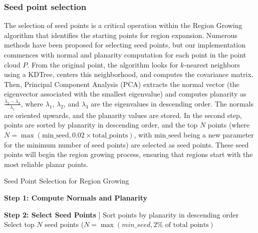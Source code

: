 \documentclass[a4paper,9pt]{article}
\begin{document}
\subsubsection{Seed point selection}

The selection of seed points is a critical operation within the Region Growing algorithm that identifies the starting points for region expansion. Numerous methods have been proposed for selecting seed points, but our implementation commences with normal and planarity computation for each point in the point cloud \( P \). From the original point, the algorithm looks for \( k \)-nearest neighbors using a KDTree, centers this neighborhood, and computes the covariance matrix. Then, Principal Component Analysis (PCA) extracts the normal vector (the eigenvector associated with the smallest eigenvalue) and computes planarity as \( \frac{\lambda_2 - \lambda_3}{\lambda_1} \), where \( \lambda_1 \), \( \lambda_2 \), and \( \lambda_3 \) are the eigenvalues in descending order. The normals are oriented upwards, and the planarity values are stored. In the second step, points are sorted by planarity in descending order, and the top \( N \) points (where \( N = \max(\text{min\_seed}, 0.02 \times \text{total\_points}) \), with \(\text{min\_seed}\) being a new parameter for the minimum number of seed points) are selected as seed points. These seed points will begin the region growing process, ensuring that regions start with the most reliable planar points.


\begin{algorithm}[H]
\caption{Seed Point Selection for Region Growing}
\label{alg:plane_detection}


\BlankLine
\textbf{Step 1: Compute Normals and Planarity}

\BlankLine
\textbf{Step 2: Select Seed Points}
\Begin]{
    Sort points by planarity in descending order\;
    Select top $N$ seed points ($N = \max(min\_seed, 2\% \text{ of total points})$\;
}
\end{algorithm}
\end{document}
